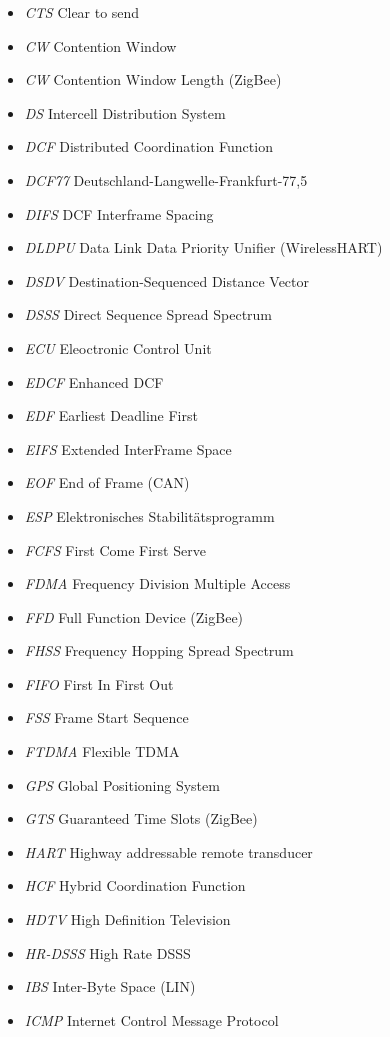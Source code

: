 \documentclass{article}
\begin{document}
\begin{itemize}
	\item \emph{CTS} Clear to send
	\item \emph{CW} Contention Window
	\item \emph{CW} Contention Window Length (ZigBee)
	\item \emph{DS} Intercell Distribution System
	\item \emph{DCF} Distributed Coordination Function
	\item \emph{DCF77} Deutschland-Langwelle-Frankfurt-77,5
	\item \emph{DIFS} DCF Interframe Spacing
	\item \emph{DLDPU} Data Link Data Priority Unifier (WirelessHART)
	\item \emph{DSDV} Destination-Sequenced Distance Vector
	\item \emph{DSSS} Direct Sequence Spread Spectrum
	\item \emph{ECU} Eleoctronic Control Unit
	\item \emph{EDCF} Enhanced DCF
	\item \emph{EDF} Earliest Deadline First
	\item \emph{EIFS} Extended InterFrame Space
	\item \emph{EOF} End of Frame (CAN)
	\item \emph{ESP} Elektronisches Stabilitätsprogramm
	\item \emph{FCFS} First Come First Serve
	\item \emph{FDMA} Frequency Division Multiple Access
	\item \emph{FFD} Full Function Device (ZigBee)
	\item \emph{FHSS} Frequency Hopping Spread Spectrum
	\item \emph{FIFO} First In First Out
	\item \emph{FSS} Frame Start Sequence
	\item \emph{FTDMA} Flexible TDMA
	\item \emph{GPS} Global Positioning System
	\item \emph{GTS} Guaranteed Time Slots (ZigBee)
	\item \emph{HART} Highway addressable remote transducer
	\item \emph{HCF} Hybrid Coordination Function
	\item \emph{HDTV} High Definition Television
	\item \emph{HR-DSSS} High Rate DSSS
	\item \emph{IBS} Inter-Byte Space (LIN)
	\item \emph{ICMP} Internet Control Message Protocol

\end{itemize}
\end{document}
